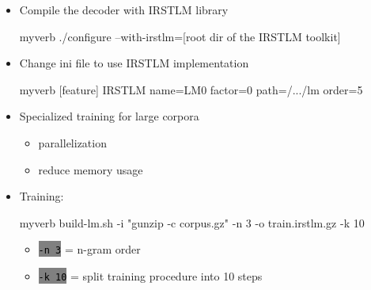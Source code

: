 \documentclass[landscape]{uedslides2C}
\newcommand{\littlecode}[1]{\colorbox{gray}{\textcolor{black}{\small \tt #1}}}
\begin{document}

\vspace{20mm}
\begin{itemize}
\item Compile the decoder with IRSTLM library \\
\begin{SaveVerbatim}{myverb} 
./configure --with-irstlm=[root dir of the IRSTLM toolkit] 
\end{SaveVerbatim}
\colorbox{gray}{}

\item Change ini file to use IRSTLM implementation \\
\begin{SaveVerbatim}{myverb} 
[feature]
IRSTLM name=LM0 factor=0 path=/.../lm order=5
\end{SaveVerbatim}
\colorbox{gray}{}

\end{itemize}

\vspace{10mm}
\begin{itemize}
\item Specialized training for large corpora
	\begin{itemize}
	\item parallelization
	\item reduce memory usage
	\end{itemize}
\item Training: \\
\begin{SaveVerbatim}{myverb} 
build-lm.sh -i "gunzip -c corpus.gz" -n 3 
      -o train.irstlm.gz -k 10
\end{SaveVerbatim}
\colorbox{gray}{}

\begin{itemize}
\item \littlecode{-n 3} = n-gram order
\item \littlecode{-k 10} = split training procedure into 10 steps
\end{itemize}

\end{itemize}

\end{document}
